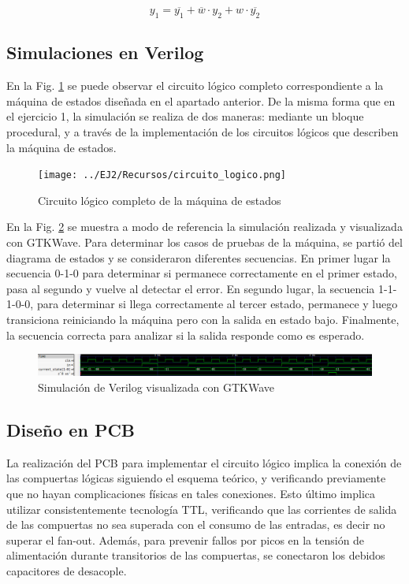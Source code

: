 \begin{equation}
    y_1 = \overline{y_1} + \overline{w} \cdot y_2 + w \cdot \overline{y_2}
\end{equation}

\subsection{Simulaciones en Verilog}
En la Fig. \ref{fig:circuito_logico_ej2} se puede observar el circuito l\'ogico completo correspondiente a la m\'aquina de estados dise\~nada
en el apartado anterior. De la misma forma que en el ejercicio 1, la simulación se realiza de dos maneras: mediante un bloque procedural, y a través de la implementación 
de los circuitos lógicos que describen la máquina de estados.

\begin{figure}[H]
    \centering
    \texttt{[image: ../EJ2/Recursos/circuito\_logico.png]}
    \caption{Circuito l\'ogico completo de la m\'aquina de estados}
    \label{fig:circuito_logico_ej2}
\end{figure}

En la Fig. \ref{fig:ej2_simulacion} se muestra a modo de referencia la simulaci\'on realizada y visualizada con GTKWave. Para determinar los casos de pruebas de la m\'aquina,
se parti\'o del diagrama de estados y se consideraron diferentes secuencias. En primer lugar la secuencia 0-1-0 para determinar si permanece correctamente en el primer estado,
pasa al segundo y vuelve al detectar el error. En segundo lugar, la secuencia 1-1-1-0-0, para determinar si llega correctamente al tercer estado, permanece y luego transiciona reiniciando
la m\'aquina pero con la salida en estado bajo. Finalmente, la secuencia correcta para analizar si la salida responde como es esperado.

\begin{figure}[H]
    \centering
    \includegraphics[scale=0.4]{../EJ2/Recursos/simulacion.png}    
    \caption{Simulaci\'on de Verilog visualizada con GTKWave}
    \label{fig:ej2_simulacion}
\end{figure}

\subsection{Dise\~no en PCB}
La realizaci\'on del PCB para implementar el circuito l\'ogico implica la conexi\'on de las compuertas l\'ogicas siguiendo
el esquema te\'orico, y verificando previamente que no hayan complicaciones f\'isicas en tales conexiones. Esto \'ultimo implica
utilizar consistentemente tecnolog\'ia TTL, verificando que las corrientes de salida de las compuertas no sea superada con el consumo
de las entradas, es decir no superar el fan-out. Adem\'as, para prevenir fallos por picos en la tensi\'on de alimentaci\'on durante transitorios de las compuertas,
se conectaron los debidos capacitores de desacople.

